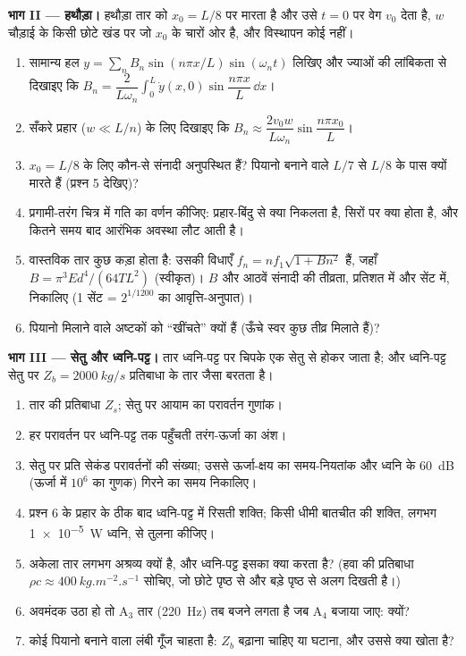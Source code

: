 \begin{problem}
\medskip
\noindent\textbf{भाग II --- हथौड़ा।}
हथौड़ा तार को $x_0 = L/8$ पर मारता है और उसे $t = 0$ पर वेग $v_0$ देता है,
$w$ चौड़ाई के किसी छोटे खंड पर जो $x_0$ के चारों ओर है, और विस्थापन कोई नहीं।
\begin{enumerate}[resume]
  \item सामान्य हल $y = \sum_nB_n\sin(n\pi x/L)\sin(\omega_nt)$ लिखिए
        और ज्याओं की लांबिकता से दिखाइए कि $B_n =
        \dfrac{2}{L\omega_n}\int_0^L\dot y(x, 0)\sin\dfrac{n\pi x}L\,\dd x$।
  \item सँकरे प्रहार ($w \ll L/n$) के लिए दिखाइए कि $B_n \approx \dfrac{2v_0w}
        {L\omega_n}\sin\dfrac{n\pi x_0}{L}$।
  \item $x_0 = L/8$ के लिए कौन-से संनादी अनुपस्थित हैं? पियानो बनाने
        वाले $L/7$ से $L/8$ के पास क्यों मारते हैं (प्रश्न 5 देखिए)?
  \item प्रगामी-तरंग चित्र में गति का वर्णन कीजिए: प्रहार-बिंदु से क्या
        निकलता है, सिरों पर क्या होता है, और
        कितने समय बाद आरंभिक अवस्था लौट आती है।
  \item वास्तविक तार कुछ कड़ा होता है: उसकी विधाएँ $f_n = nf_1
        \sqrt{1 + Bn^2}$ हैं, जहाँ $B = \pi^3Ed^4/(64TL^2)$ (स्वीकृत)।
        $B$ और आठवें संनादी की तीव्रता, प्रतिशत में और
        सेंट में, निकालिए (\num{1} सेंट = $2^{1/1200}$ का आवृत्ति-अनुपात)।
  \item पियानो मिलाने वाले अष्टकों को ``खींचते'' क्यों हैं (ऊँचे स्वर
        कुछ तीव्र मिलाते हैं)?
\end{enumerate}

\medskip
\noindent\textbf{भाग III --- सेतु और ध्वनि-पट्ट।}
तार ध्वनि-पट्ट पर चिपके एक सेतु से होकर जाता है; और ध्वनि-पट्ट
सेतु पर $Z_b = \qty{2000}{kg/s}$ प्रतिबाधा के तार जैसा बरतता है।
\begin{enumerate}[resume]
  \item तार की प्रतिबाधा $Z_s$; सेतु पर आयाम का परावर्तन गुणांक।
  \item हर परावर्तन पर ध्वनि-पट्ट तक पहुँचती तरंग-ऊर्जा का
        अंश।
  \item सेतु पर प्रति सेकंड परावर्तनों की संख्या; उससे ऊर्जा-क्षय का
        समय-नियतांक और ध्वनि के \qty{60}{dB} (ऊर्जा में $10^6$ का गुणक)
        गिरने का समय निकालिए।
  \item प्रश्न 6 के प्रहार के ठीक बाद ध्वनि-पट्ट में रिसती शक्ति;
        किसी धीमी बातचीत की शक्ति, लगभग \qty{1e-5}{W} ध्वनि, से
        तुलना कीजिए।
  \item अकेला तार लगभग अश्रव्य क्यों है, और ध्वनि-पट्ट इसका क्या
        करता है? (हवा की प्रतिबाधा
        $\rho c \approx \qty{400}{kg.m^{-2}.s^{-1}}$ सोचिए, जो छोटे
        पृष्ठ से और बड़े पृष्ठ से अलग दिखती है।)
  \item अवमंदक उठा हो तो A$_3$ तार (\qty{220}{Hz}) तब बजने लगता है जब
        A$_4$ बजाया जाए: क्यों?
  \item कोई पियानो बनाने वाला लंबी गूँज चाहता है: $Z_b$ बढ़ाना चाहिए या
        घटाना, और उससे क्या खोता है?
\end{enumerate}


\end{problem}
